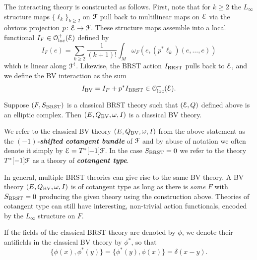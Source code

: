 \documentclass[10pt, oneside]{article}
\newcommand{\defterm}[1]{\textbf{\emph{#1}}}
\begin{document}
The interacting theory is constructed as follows. First, note that for $k \geq 2$ the $L_\infty$ structure maps $\{\ell_k\}_{k \geq 2}$ on $\mathcal F$ pull back to multilinear maps on $\mathcal E$ via the obvious projection $p\colon \mathcal E\rightarrow \mathcal F$. These structure maps assemble into a local functional $I_F \in \mathcal{O}_{\rm loc}^+(\mathcal E)$ defined by
\[
I_F (e) = \sum_{k \geq 2} \frac{1}{(k+1)!} \int_M \omega_F(e, (p^*\ell_k) (e, \ldots, e))
\] 
which is linear along $\mathcal F^!$. Likewise, the BRST action $I_{\mathrm{BRST}}$ pulls back to $\mathcal E$, and we define the BV interaction as the sum
\[
I_{\mathrm{BV}} = I_{F} + p^* I_{\mathrm{BRST}} \in \mathcal{O}_{\rm loc}^+(\mathcal E) .
\]

\begin{lemma}
Suppose $(F, S_{\mathrm{BRST}})$ is a classical BRST theory such that $(\mathcal E, Q)$ defined above is an elliptic complex. Then $(E, Q_{\mathrm{BV}}, \omega, I)$ is a classical BV theory.
\end{lemma}

We refer to the classical BV theory $(E, Q_{\mathrm{BV}}, \omega, I)$ from the above statement as the \defterm{$(-1)$-shifted cotangent bundle} of $\mathcal F$ and by abuse of notation we often denote it simply by $\mathcal E = T^*[-1] \mathcal F$. In the case $S_{\mathrm{BRST}} = 0$ we refer to the theory $T^*[-1] \mathcal F$ as a theory of \defterm{cotangent type}.

\begin{remark}
In general, multiple BRST theories can give rise to the same BV theory.  A BV theory $(E, Q_{\mathrm{BV}}, \omega, I)$ is of cotangent type as long as there is \emph{some} $F$ with $S_{\mathrm{BRST}} = 0$ producing the given theory using the construction above.  Theories of cotangent type can still have interesting, non-trivial action functionals, encoded by the $L_\infty$ structure on $F$.
\end{remark}

If the fields of the classical BRST theory are denoted by $\phi$, we denote their antifields in the classical BV theory by $\phi^*$, so that
\[\{\phi(x), \phi^*(y)\} = \{\phi^*(y), \phi(x)\} = \delta(x-y).\]
 
\end{document}
